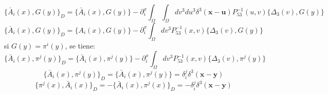 \documentclass[a4paper,12pt]{article}
\begin{document}
$$\{\bar{A}_i(x),G(y)\}_D=\{\bar{A}_i(x),G(y)\}-\partial_i^x\int_{\Omega}\int_\Omega dv^3du^3\delta^3(\textbf{x}-\textbf{u})P_{53}^{-1}(u,v)\{\Delta_3(v),G(y)\}
$$
$$\{\bar{A}_i(x),G(y)\}_D=\{A_i(x),G(y)\}-\partial_i^x\int_\Omega dv^3P_{53}^{-1}(x,v)\{\Delta_3(v),G(y)\}
$$
si $G(y)=\pi^i(y)$, se tiene: 
\begin{equation}
\{\bar{A}_i(x),\pi^j(y)\}_D=\{\bar{A}_i(x),\pi^j(y)\}-\partial_i^x\int_\Omega dv^3P_{53}^{-1}(x,v)\{\Delta_3(v),\pi^j(y)\}
\end{equation}
$$\{\bar{A}_i(x),\pi^j(y)\}_D=\{\bar{A}_i(x),\pi^j(y)\}=\delta_i^j\delta^3(\textbf{x}-\textbf{y})$$
\begin{equation}
\{\pi^j(x),\bar{A}_i(x)\}_D=-\{\bar{A}_i(x),\pi^j(x)\}_D=-\delta_i^j\delta^3(\textbf{x}-\textbf{y})
\end{equation}
\vspace{0,4cm}

\\
\end{document}
